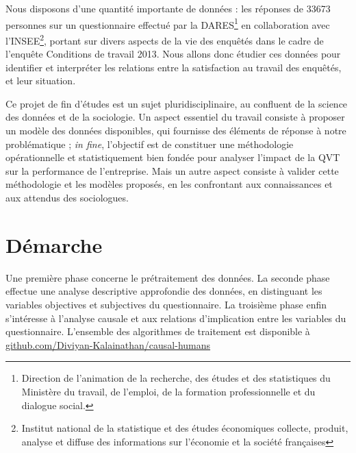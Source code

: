 \documentclass[11pt,fleqn,openany,frenchb]{book} %
\def\NOTE#1{\footnote{MS : #1}}
\begin{document}
Nous disposons d'une quantité importante de données : les réponses de 33673 personnes sur un questionnaire effectué par la DARES\footnote{Direction de l'animation de la recherche, des études et des statistiques du Ministère du travail, de l'emploi, de la formation professionnelle et du dialogue social.} en collaboration avec l'INSEE\footnote{Institut national de la statistique et des études économiques collecte, produit, analyse et diffuse des informations sur l'économie et la société françaises}, portant sur divers aspects de la vie des enquêtés dans le cadre de l'enquête Conditions de travail 2013. Nous allons donc étudier ces données pour identifier et interpréter les relations entre 
la satisfaction au travail des enquêtés, et leur situation.
\par

Ce projet de fin d'études est un sujet pluridisciplinaire, au confluent de la science des données et de la sociologie. Un aspect essentiel du travail consiste à proposer un modèle des données disponibles, qui fournisse des éléments de réponse à notre problématique ; {\em in fine}, l'objectif est de constituer une  méthodologie opérationnelle et statistiquement bien fondée pour analyser l'impact de la QVT sur la performance de l'entreprise. Mais un autre aspect consiste à valider cette méthodologie et les modèles proposés, en les confrontant aux connaissances et aux attendus des sociologues.\par

\section{Démarche}
Une première phase concerne le prétraitement des données. La seconde phase effectue une analyse descriptive approfondie des données, en distinguant les variables objectives et subjectives du questionnaire. 
La troisième phase enfin s'intéresse à l'analyse causale et aux relations d'implication entre les variables du
questionnaire. L'ensemble des algorithmes de traitement est disponible à \href{https://github.com/Diviyan-Kalainathan/causal-humans}{github.com/Diviyan-Kalainathan/causal-humans}\par
\end{document}
